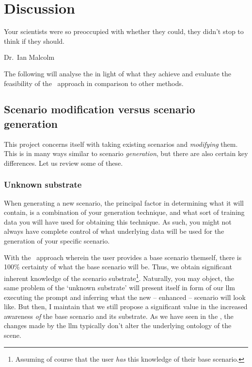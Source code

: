 \chapter{Discussion}\label{chp:discussion}

\epigraph{Your scientists were so preoccupied with whether they could, they didn't stop to think if they should.}{Dr.~Ian Malcolm}

The following will analyse the  in light of what they achieve and evaluate the
feasibility of the \hefe~approach in comparison to other methods.

\section{Scenario modification versus scenario generation}

This project concerns itself with taking existing scenarios and \emph{modifying} them. This is in
many ways similar to scenario \emph{generation}, but there are also certain key differences. Let us
review some of these.

\subsection{Unknown substrate}

When generating a new scenario, the principal factor in determining what it will contain, is a
combination of your generation technique, and what sort of training data you will have used for
obtaining this technique. As such, you might not always have complete control of what underlying
data will be used for the generation of your specific scenario.

With the \hefe~approach wherein the user provides a base scenario themself, there is \num{100}\%
certainty of what the base scenario will be. Thus, we obtain significant inherent knowledge of the
scenario substrate\footnote{Assuming of course that the user \emph{has} this knowledge of their base
    scenario.}. Naturally, you may object, the same problem of the `unknown substrate' will present
itself in form of our \acrshort{llm} executing the prompt and inferring what the new -- enhanced --
scenario will look like. But then, I maintain that we still propose a significant value in the
increased awareness \emph{of} the base scenario and its substrate. As we have seen in the
, the changes made by the \acrshort{llm} typically don't alter the underlying
ontology of the scene.

